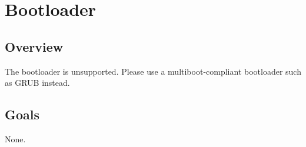 
\section{Bootloader}

\subsection{Overview}

The bootloader is unsupported. Please use a multiboot-compliant bootloader such as GRUB instead.

\subsection{Goals}

None.
